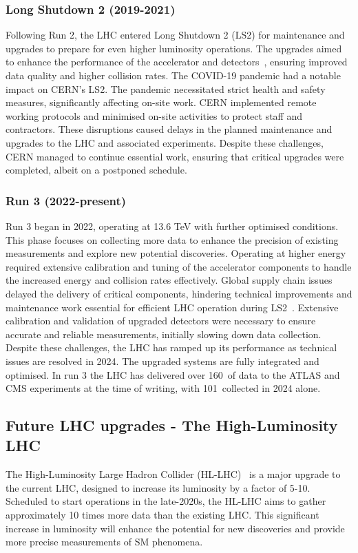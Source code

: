         \subsubsection{Long Shutdown 2 (2019-2021)}
            Following Run 2, the LHC entered Long Shutdown 2 (LS2) for maintenance and upgrades to prepare for even higher 
            luminosity operations. The upgrades aimed to enhance the performance of the accelerator and detectors~\cite{Arduini_2024}, ensuring 
            improved data quality and higher collision rates.
            The COVID-19 pandemic had a notable impact on CERN's LS2. The pandemic necessitated strict health and safety 
            measures, significantly affecting on-site work. CERN implemented remote working protocols and minimised on-site 
            activities to protect staff and contractors. These disruptions caused delays in the planned maintenance and 
            upgrades to the LHC and associated experiments. Despite these challenges, CERN managed to continue essential 
            work, ensuring that critical upgrades were completed, albeit on a postponed schedule. 
        \subsubsection{Run 3 (2022-present)}
            Run 3 began in 2022, operating at 13.6 TeV with further optimised conditions. This phase focuses on collecting 
            more data to enhance the precision of existing measurements and explore new potential discoveries. 
            Operating at higher energy required extensive calibration and tuning of the accelerator 
            components to handle the increased energy and collision rates effectively. Global supply chain issues delayed the delivery of critical components, hindering 
            technical improvements and maintenance work essential for efficient LHC operation during LS2~\cite{Perrot:2845779,covid19_economics}.
            Extensive calibration and validation of upgraded detectors were necessary to ensure accurate and reliable measurements, initially slowing down data collection.
            Despite these challenges, the LHC has ramped up its performance as technical issues are resolved in 2024. The 
            upgraded systems are fully integrated and optimised. In run 3 the LHC has delivered over 160~\ifb of data to the ATLAS and CMS 
            experiments at the time of writing, with 101~\ifb collected in 2024 alone. 

    \subsection{Future LHC upgrades - The High-Luminosity LHC}
        The High-Luminosity Large Hadron Collider (HL-LHC)~\cite{HighLuminosityLHC} is a major upgrade to the current LHC, designed to increase 
        its luminosity by a factor of 5-10. Scheduled to start operations in the late-2020s, the HL-LHC aims to gather 
        approximately 10 times more data than the existing LHC. This significant increase in luminosity will enhance 
        the potential for new discoveries and provide more precise measurements of SM phenomena. 

